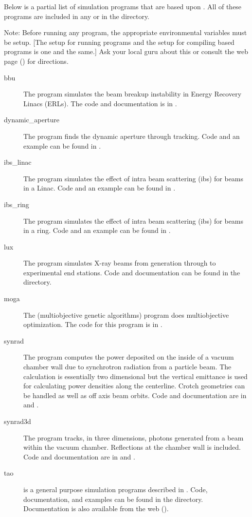 \documentclass{hitec}
\begin{document}
Below is a partial list of simulation programs that are based upon \bmad. All of these
programs are included in any  or  in the 
directory.

Note: Before running any program, the appropriate environmental variables must be setup.
[The setup for running programs and the setup for compiling \bmad based programs is one
and the same.] Ask your local \bmad guru about this or consult the \bmad web page
() for directions.

  \begin{description}
  \item[bbu] \Newline
The  program simulates the beam breakup instability in Energy Recovery Linacs (ERLs).
The  code and documentation is in .
  \item[dynamic_aperture] \Newline
The  program finds the dynamic aperture through tracking. Code and an
example can be found in .
  \item[ibs_linac] \Newline
The  program simulates the effect of intra beam scattering (ibs) for beams
in a Linac. Code and an example can be found in .
  \item[ibs_ring] \Newline
The  program simulates the effect of intra beam scattering (ibs) for beams
in a ring. Code and an example can be found in .
  \item[lux] \Newline
The  program simulates X-ray beams from generation through to experimental end stations.
Code and documentation can be found in the  directory.
  \item[moga] \Newline
The  (multiobjective genetic algorithms) program does multiobjective
optimization. The code for this program is in .
  \item[synrad] \Newline
The  program computes the power deposited on the inside of a vacuum chamber
wall due to synchrotron radiation from a particle beam. The calculation is essentially two
dimensional but the vertical emittance is used for calculating power densities along the
centerline. Crotch geometries can be handled as well as off axis beam orbits. Code and
documentation are in  and . 
  \item[synrad3d] \Newline
The  program tracks, in three dimensions, photons generated from a beam
within the vacuum chamber. Reflections at the chamber wall is included. Code and
documentation are in  and .
  \item[tao] \Newline
\tao is a general purpose simulation programs described in . Code,
documentation, and examples can be found in the  directory. Documentation is also
available from the web ().
  \end{description}
\end{document}
